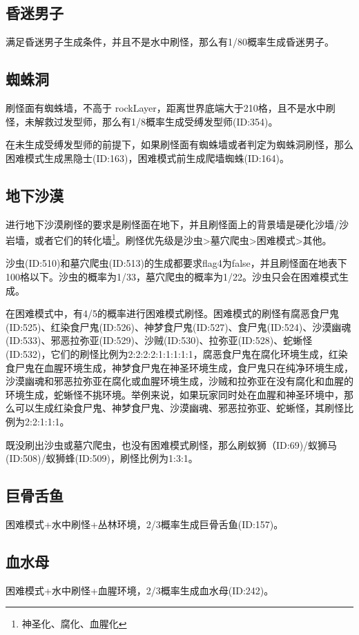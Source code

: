 \subsection{昏迷男子}
满足昏迷男子生成条件，并且不是水中刷怪，那么有1/80概率生成昏迷男子。

\subsection{蜘蛛洞}
刷怪面有蜘蛛墙，不高于 rockLayer，距离世界底端大于210格，且不是水中刷怪，未解救过发型师，那么有1/8概率生成受缚发型师(ID:354)。

在未生成受缚发型师的前提下，如果刷怪面有蜘蛛墙或者判定为蜘蛛洞刷怪，那么困难模式生成黑隐士(ID:163)，困难模式前生成爬墙蜘蛛(ID:164)。

\subsection{地下沙漠}
进行地下沙漠刷怪的要求是刷怪面在地下，并且刷怪面上的背景墙是硬化沙墙/沙岩墙，或者它们的转化墙\footnote{神圣化、腐化、血腥化}。刷怪优先级是沙虫>墓穴爬虫>困难模式>其他。

沙虫(ID:510)和墓穴爬虫(ID:513)的生成都要求flag4为false，并且刷怪面在地表下100格以下。沙虫的概率为1/33，墓穴爬虫的概率为1/22。沙虫只会在困难模式生成。

在困难模式中，有4/5的概率进行困难模式刷怪。困难模式的刷怪有腐恶食尸鬼(ID:525)、红染食尸鬼(ID:526)、神梦食尸鬼(ID:527)、食尸鬼(ID:524)、沙漠幽魂(ID:533)、邪恶拉弥亚(ID:529)、沙贼(ID:530)、拉弥亚(ID:528)、蛇蜥怪(ID:532)，它们的刷怪比例为2:2:2:2:1:1:1:1:1，腐恶食尸鬼在腐化环境生成，红染食尸鬼在血腥环境生成，神梦食尸鬼在神圣环境生成，食尸鬼只在纯净环境生成，沙漠幽魂和邪恶拉弥亚在腐化或血腥环境生成，沙贼和拉弥亚在没有腐化和血腥的环境生成，蛇蜥怪不挑环境。举例来说，如果玩家同时处在血腥和神圣环境中，那么可以生成红染食尸鬼、神梦食尸鬼、沙漠幽魂、邪恶拉弥亚、蛇蜥怪，其刷怪比例为2:2:1:1:1。

既没刷出沙虫或墓穴爬虫，也没有困难模式刷怪，那么刷蚁狮（ID:69)/蚁狮马(ID:508)/蚁狮蜂(ID:509)，刷怪比例为1:3:1。

\subsection{巨骨舌鱼}
困难模式+水中刷怪+丛林环境，2/3概率生成巨骨舌鱼(ID:157)。

\subsection{血水母}
困难模式+水中刷怪+血腥环境，2/3概率生成血水母(ID:242)。

